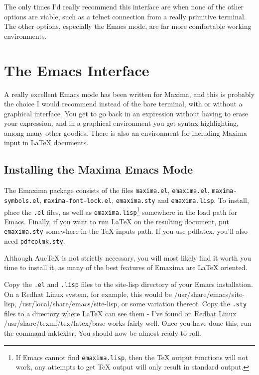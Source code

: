 The only times I'd really recommend this interface are when none of
the other options are viable, such as a telnet connection from a really
primitive terminal.  The other options, especially
the Emacs mode, are far more comfortable working environments. 

\section{The Emacs Interface}

A really excellent Emacs mode has been written for Maxima, and this is probably the
choice I would recommend instead of the bare terminal, with or without
a graphical interface. You get to
go back in an expression without having to erase your expression,
and in a graphical environment you get syntax highlighting, among many other
goodies.  There is also an environment for including Maxima input in LaTeX
documents.

\subsection{Installing the Maxima Emacs Mode}

\noindent
The Emaxima package consists of the files \texttt{maxima.el},
\texttt{emaxima.el}, \texttt{maxima-symbols.el},
\texttt{maxima-font-lock.el}, \texttt{emaxima.sty} and \texttt{emaxima.lisp}.
To install, place the \texttt{.el} files, as well as
\texttt{emaxima.lisp}\footnote{If Emacs cannot find
  \texttt{emaxima.lisp}, then the \TeX{} output functions will not
  work, any attempts to get \TeX{} output will only result in standard
  output.} 
somewhere in the load path for Emacs.
Finally, if you want to run \LaTeX{} on the resulting document, put
\texttt{emaxima.sty} somewhere in the \TeX{} inputs path.  If you use
pdflatex, you'll also need \texttt{pdfcolmk.sty}.

Although AucTeX is not strictly necessary, you will most likely find it worth
you time to install it, as many of the best features of Emaxima are LaTeX
oriented.  

Copy the \texttt{.el} and \texttt{.lisp} files to the site-lisp directory of your Emacs installation.
On a Redhat Linux system, for example, this would be /usr/share/emacs/site-lisp,
/usr/local/share/emacs/site-lisp, or some variation thereof.  Copy the \texttt{.sty}
files to a directory where LaTeX can see them - I've found on Redhat Linux
/usr/share/texmf/tex/latex/base works fairly well.  Once you have done this,
run the command mktexlsr.  You should now be almost ready to roll.

